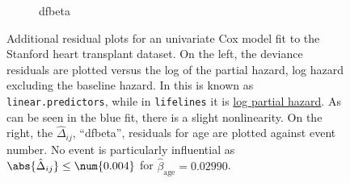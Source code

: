 \begin{figure}[H]
\begin{subfigure}[c]{0.48\textwidth}
  \caption{dfbeta}
  \label{fig:cox:outliers:dfbeta}
  \end{subfigure}
\caption{
Additional residual plots for
an univariate Cox model fit to the Stanford heart transplant dataset.
On the left, the deviance residuals are plotted versus the
log of the partial hazard, \ie log hazard excluding the baseline hazard.
In \R this is known as \texttt{linear.predictors}, while in \texttt{lifelines} it is
\href{https://lifelines.readthedocs.io/en/latest/fitters/regression/CoxPHFitter.html\#lifelines.fitters.coxph_fitter.SemiParametricPHFitter.predict_log_partial_hazard}{log partial hazard}.
As can be seen in the blue fit, there is a slight nonlinearity.
On the right, the $\hat{\Delta}_{ij}$, \ie ``dfbeta'', residuals for age
are plotted against event number.
No event is particularly influential as $\abs{\hat{\Delta}_{ij}} \leq \num{0.004}$
for $\hat{\beta}_{\text{age}} = \num{0.02990}$.
}
\label{fig:cox:outliers}
\end{figure}
